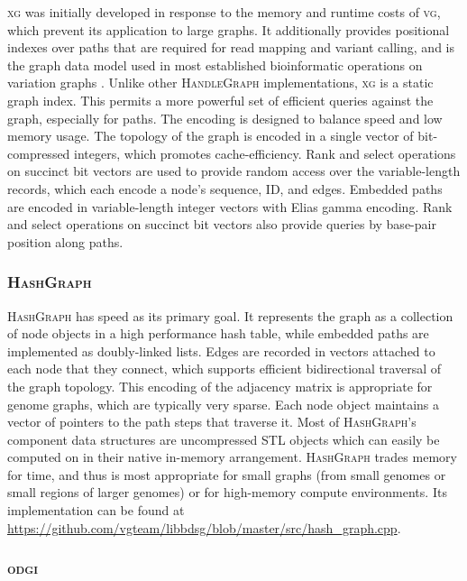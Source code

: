 \documentclass{article}
\begin{document}
\textsc{xg} was initially developed in response to the memory and runtime costs of \textsc{vg}, which prevent its application to large graphs.
It additionally provides positional indexes over paths that are required for read mapping and variant calling, and is the graph data model used in most established bioinformatic operations on variation graphs \cite{Garrison_2018,hickey2020genotyping}.
Unlike other \textsc{HandleGraph} implementations, \textsc{xg} is a static graph index.
This permits a more powerful set of efficient queries against the graph, especially for paths.
The encoding is designed to balance speed and low memory usage.
The topology of the graph is encoded in a single vector of bit-compressed integers, which promotes cache-efficiency.
Rank and select operations on succinct bit vectors are used to provide random access over the variable-length records, which each encode a node's sequence, ID, and edges.
Embedded paths are encoded in variable-length integer vectors with Elias gamma encoding.
Rank and select operations on succinct bit vectors also provide queries by base-pair position along paths.

\subsubsection{\textsc{HashGraph}}

\textsc{HashGraph} has speed as its primary goal.
It represents the graph as a collection of node objects in a high performance hash table, while embedded paths are implemented as doubly-linked lists.
Edges are recorded in vectors attached to each node that they connect, which supports efficient bidirectional traversal of the graph topology.
This encoding of the adjacency matrix is appropriate for genome graphs, which are typically very sparse.
Each node object maintains a vector of pointers to the path steps that traverse it.
Most of \textsc{HashGraph}'s component data structures are uncompressed STL objects which can easily be computed on in their native in-memory arrangement.
\textsc{HashGraph} trades memory for time, and thus is most appropriate for small graphs (from small genomes or small regions of larger genomes) or for high-memory compute environments.
Its implementation can be found at \url{https://github.com/vgteam/libbdsg/blob/master/src/hash_graph.cpp}.

\subsubsection{\textsc{odgi}}
\end{document}
